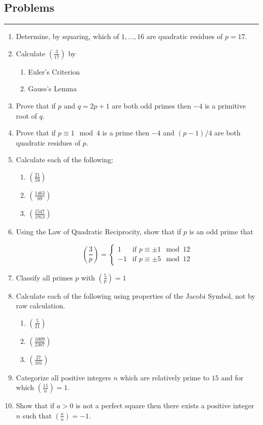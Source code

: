 \documentclass[class=article, crop=false]{standalone}
\def\leg#1#2{\left(\frac{#1}{#2}\right)}
\begin{document}
\subsection{Problems}
\rule{\textwidth}{1pt}
\begin{enumerate}
\item
	Determine, by squaring,
	which of $1,...,16$ are quadratic residues of $p=17$.

\item Calculate $\leg 3{17}$ by
\begin{enumerate}
\item
	Euler's Criterion
\item
	Gauss's Lemma
\end{enumerate}

\item
	Prove that if $p$ and $q=2p+1$ are both odd primes
	then $-4$ is a primitive root of $q$.

\item
	Prove that if $p\equiv 1\mod 4$ is a prime
	then $-4$ and $(p-1)/4$ are both quadratic residues of $p$.

\item
	Calculate each of the following:
	\begin{enumerate}
	\item
		$\leg{21}{59}$
	\item
		$\leg{1463}{89}$
	\item
		$\leg{1547}{1913}$
	\end{enumerate}

\item
	Using the Law of Quadratic Reciprocity, show that if $p$ is an odd prime that

	$$\leg3p=
	\begin{cases}
		1  & \text{if $p\equiv\pm1\mod 12$} \\
		-1 & \text{if $p\equiv\pm5\mod 12$}
	\end{cases}
	$$

\item
	Classify all primes $p$ with $\leg5p=1$

\item
	Calculate each of the following using properties of
	the Jacobi Symbol, not by raw calculation.
	\begin{enumerate}
	\item
		$\leg{5}{21}$
	\item
		$\leg{1009}{2307}$
	\item
		$\leg{27}{101}$
	\end{enumerate}

\item
	Categorize all positive integers $n$
	which are relatively prime to $15$ and for which $\leg{15}{n}=1$.

\item
	Show that if $a>0$ is not a perfect square then there exists
	a positive integer $n$ such that $\leg a n = -1$.

\end{enumerate}
\end{document}

